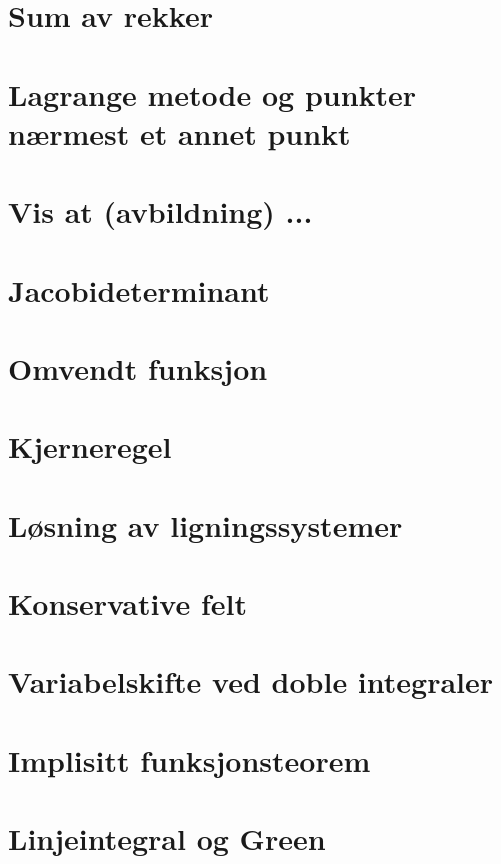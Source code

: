 \documentclass{article}
\begin{document}
  \section*{Sum av rekker}
    
  \section*{Lagrange metode og punkter nærmest et annet punkt}
    
  \section*{Vis at (avbildning) ...}
    
  \section*{Jacobideterminant}
    
  \section*{Omvendt funksjon}
    
  \section*{Kjerneregel}
    
  \section*{Løsning av ligningssystemer}
    
  \section*{Konservative felt}
    
  \section*{Variabelskifte ved doble integraler}
    
  \section*{Implisitt funksjonsteorem}
    
  \section*{Linjeintegral og Green}
    
\end{document}
